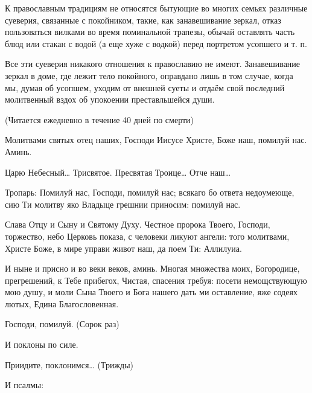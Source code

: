 К православным традициям не относятся бытующие во многих семьях различные суеверия, связанные с покойником, такие, как занавешивание зеркал, отказ пользоваться вилками во время поминальной трапезы, обычай оставлять часть блюд или стакан с водой (а еще хуже с водкой) перед портретом усопшего и т. п. 

Все эти суеверия никакого отношения к православию не имеют. Занавешивание зеркал в доме, где лежит тело покойного, оправдано лишь в том случае, когда мы, думая об усопшем, уходим от внешней суеты и отдаём свой последний молитвенный вздох об упокоении преставльшейся души.\bfseries \itshape  

\normalfont{}\normalfont{} 
\mychapterending

 


(Читается ежедневно в течение 40 дней по смерти) 

Молитвами святых отец наших, Господи Иисусе Христе, Боже наш, помилуй нас. Аминь. 

Царю Небесный… Трисвятое. Пресвятая Троице… Отче наш… 

Тропарь: Помилуй нас, Господи, помилуй нас; всякаго бо ответа недоумеюще, сию Ти молитву яко Владыце грешнии приносим: помилуй нас. 

Слава Отцу и Сыну и Святому Духу. Честное пророка Твоего, Господи, торжество, небо Церковь показа, с человеки ликуют ангели: того молитвами, Христе Боже, в мире управи живот наш, да поем Ти: Аллилуиа. 

И ныне и присно и во веки веков, аминь. Многая множества моих, Богородице, прегрешений, к Тебе прибегох, Чистая, спасения требуя: посети немощствующую мою душу, и моли Сына Твоего и Бога нашего дать ми оставление, яже содеях лютых, Едина Благословенная. 

Господи, помилуй. (Сорок раз) 

И поклоны по силе. 

Приидите, поклонимся… (Трижды) 

И псалмы:




